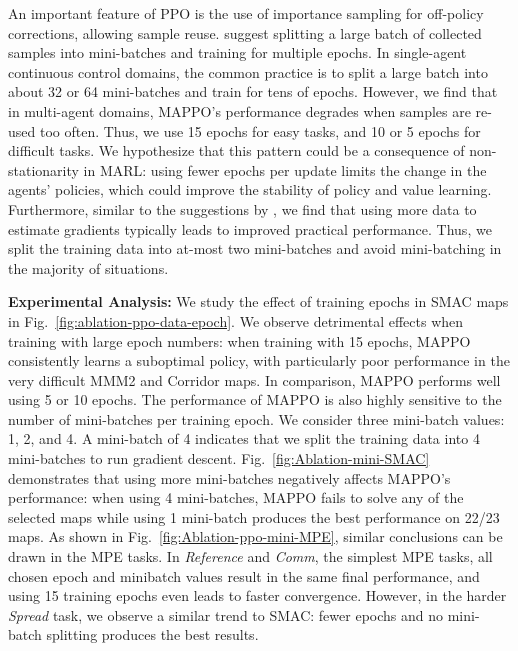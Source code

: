 \documentclass{article}
\theoremstyle{plain}
\theoremstyle{definition}
\theoremstyle{remark}
\begin{document}
An important feature of PPO is the use of importance sampling for off-policy corrections, allowing sample reuse.
\cite{stable-baselines} suggest splitting a large batch of collected samples into mini-batches and training for multiple epochs. In single-agent continuous control domains, the common practice is to split a large batch into about 32 or 64 mini-batches and train for tens of epochs. %
However, we find that in multi-agent domains, MAPPO's performance degrades when samples are re-used too often. Thus, we use 15 epochs for easy tasks, and 10 or 5 epochs for difficult tasks. We hypothesize that this pattern could be a consequence of non-stationarity in MARL: using fewer epochs per update limits the change in the agents' policies, which could improve the stability of policy and value learning.
Furthermore, similar to the suggestions by \cite{Ilyas2020A}, we find that using more data to estimate gradients typically leads to improved practical performance. Thus, we split the training data into at-most two mini-batches and avoid mini-batching in the majority of situations.


\textbf{Experimental Analysis:} We study the effect of training epochs in SMAC maps in Fig.~\ref{fig:ablation-ppo-data-epoch}. We observe detrimental effects when training with large epoch numbers: when training with 15 epochs, MAPPO consistently learns a suboptimal policy, with particularly poor performance in the very difficult MMM2 and Corridor maps. In comparison, MAPPO performs well using 5 or 10 epochs.
The performance of MAPPO is also highly sensitive to the number of mini-batches per training epoch. We consider three mini-batch values: 1, 2, and 4. A mini-batch of 4 indicates that we split the training data into 4 mini-batches to run gradient descent.
Fig.~\ref{fig:Ablation-mini-SMAC} demonstrates that using more mini-batches negatively affects MAPPO's performance: when using 4 mini-batches, MAPPO fails to solve any of the selected maps while using 1 mini-batch produces the best performance on 22/23 maps. %
As shown in Fig.~\ref{fig:Ablation-ppo-mini-MPE}, similar conclusions can be drawn in the MPE tasks. In \emph{Reference} and \emph{Comm}, the simplest MPE tasks, all chosen epoch and minibatch values result in the same final performance, and using 15 training epochs even leads to faster convergence.
However, in the harder \emph{Spread} task, we observe a similar trend to SMAC: fewer epochs and no mini-batch splitting produces the best results. 
\end{document}
